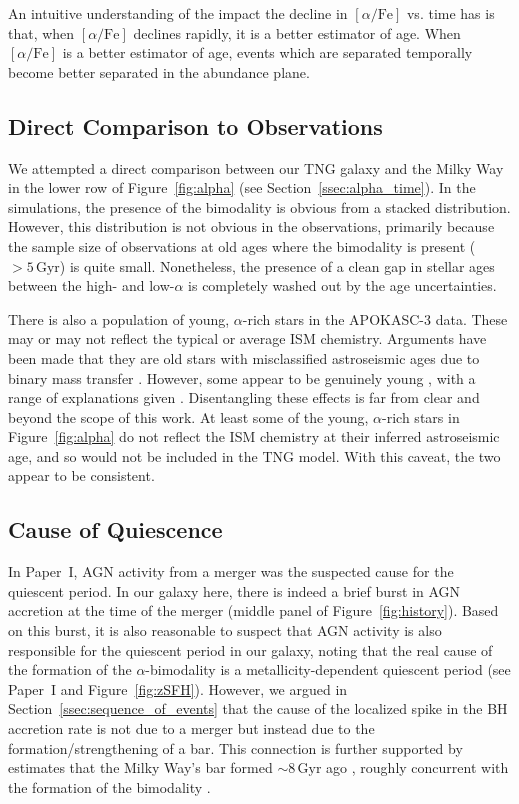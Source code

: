 \documentclass[twocolumn]{aastex631}
\newcommand{\Gyr}{\ensuremath{\textrm{Gyr}}}
\newcommand{\alphaFe}{\ensuremath{[\alpha/\textrm{Fe}]}}
\begin{document}
An intuitive understanding of the impact the decline in \alphaFe{} vs. time has is that, when \alphaFe{} declines rapidly, it is a better estimator of age. When \alphaFe{} is a better estimator of age, events which are separated temporally become better separated in the abundance plane.

\subsection{Direct Comparison to Observations}\label{ssec:compare_obs}
We attempted a direct comparison between our TNG galaxy and the Milky Way in the lower row of Figure~\ref{fig:alpha} (see Section~\ref{ssec:alpha_time}). In the simulations, the presence of the bimodality is obvious from a stacked distribution. However, this distribution is not obvious in the observations, primarily because the sample size of observations at old ages where the bimodality is present ($>5\,\Gyr$) is quite small. Nonetheless, the presence of a clean gap in stellar ages between the high- and low-$\alpha$ is completely washed out by the age uncertainties.

There is also a population of young, $\alpha$-rich stars in the APOKASC-3 data. These may or may not reflect the typical or average ISM chemistry. Arguments have been made that they are old stars with misclassified astroseismic ages due to binary mass transfer \citep[and references therein]{2023A&A...671A..21J}. However, some appear to be genuinely young \citep[and references therein]{2024arXiv241002962L}, with a range of explanations given \citep[e.g.][]{2015A&A...576L..12C,2021MNRAS.508.4484J,2023arXiv231105815S}. Disentangling these effects is far from clear and beyond the scope of this work. At least some of the young, $\alpha$-rich stars in Figure~\ref{fig:alpha} do not reflect the ISM chemistry at their inferred astroseismic age, and so would not be included in the TNG model. With this caveat, the two appear to be consistent.

\subsection{Cause of Quiescence}\label{ssec:cause_qui}
In Paper~I, AGN activity from a merger was the suspected cause for the quiescent period. In our galaxy here, there is indeed a brief burst in AGN accretion at the time of the merger (middle panel of Figure~\ref{fig:history}). Based on this burst, it is also reasonable to suspect that AGN activity is also responsible for the quiescent period in our galaxy, noting that the real cause of the formation of the $\alpha$-bimodality is a metallicity-dependent quiescent period (see Paper~I and Figure~\ref{fig:zSFH}). However, we argued in Section~\ref{ssec:sequence_of_events} that the cause of the localized spike in the BH accretion rate is not due to a merger but instead due to the formation/strengthening of a bar. This connection is further supported by estimates that the Milky Way's bar formed $\sim8\,\Gyr$ ago \citep[e.g.,][]{2019MNRAS.490.4740B,2024MNRAS.530.2972S}, roughly concurrent with the formation of the bimodality \citep{2013A&A...560A.109H,2023MNRAS.525.2208R,2024MNRAS.535..392L}.
\end{document}
